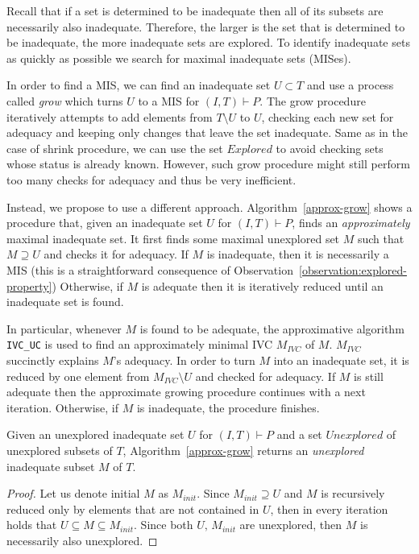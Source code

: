 Recall that if a set is determined to be inadequate then all of its subsets are necessarily also inadequate. Therefore, the larger is the set that is determined to be inadequate, the more inadequate sets are explored.  %
To identify inadequate sets as quickly as possible we search for maximal inadequate sets (MISes).

In order to find a MIS, we can find an inadequate set $U \subset T$ and use a process called \emph{grow} which turns $U$ to a MIS for $(I,T) \vdash P$.
The grow procedure iteratively attempts to add elements from $T \setminus U$ to $U$, checking each new set for adequacy and keeping only changes that leave the set inadequate. Same as in the case of shrink procedure, we can use the set $Explored$ to avoid checking sets whose status is already known.
However, such grow procedure might still perform too many checks for adequacy and thus be very inefficient.


Instead, we propose to use a different approach. Algorithm~\ref{approx-grow} shows a procedure that, given an inadequate set $U$ for $(I, T) \vdash P$, finds an \emph{approximately} maximal inadequate set.
It first finds some maximal unexplored set $M$ such that $M \supseteq U$ and checks it for adequacy.
If $M$ is inadequate, then it is necessarily a MIS
(this is a straightforward consequence of Observation~\ref{observation:explored-property}) %
Otherwise, if $M$ is adequate then it is iteratively reduced until an inadequate set is found.

In particular, whenever $M$ is found to be adequate, the approximative algorithm \texttt{IVC\_UC} is used to find an approximately minimal IVC $M_{IVC}$ of $M$.  $M_{IVC}$ succinctly explains $M$'s adequacy. In order to turn $M$ into an inadequate set, it is reduced by one element from $M_{IVC} \setminus U$ and checked for adequacy. If $M$ is still adequate then the approximate growing procedure continues with a next iteration. Otherwise, if $M$ is inadequate, the procedure finishes.

Given an unexplored inadequate set $U$ for $(I,T) \vdash P$ and a set $\mathit{Unexplored}$ of unexplored subsets of $T$, Algorithm~\ref{approx-grow} returns an \emph{unexplored} inadequate subset $M$ of $T$.

\begin{proof}
Let us denote initial $M$ as $M_{init}$. Since $M_{init} \supseteq U$ and $M$ is recursively reduced only by elements that are not contained in $U$, then in every iteration holds that $U \subseteq M \subseteq M_{init}$. Since both $U, \, M_{init}$ are unexplored, then $M$ is necessarily also unexplored.
\end{proof}

